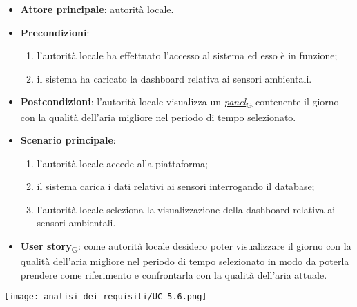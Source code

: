 \begin{itemize}
	\item \textbf{Attore principale}: autorità locale.
	\item \textbf{Precondizioni}:
	      \begin{enumerate}
		      \item l'autorità locale ha effettuato l'accesso al sistema ed esso è in funzione;
		      \item il sistema ha caricato la dashboard relativa ai sensori ambientali.
	      \end{enumerate}
	\item \textbf{Postcondizioni}: l'autorità locale visualizza un \href{https://7last.github.io/docs/rtb/documentazione-interna/glossario\#panel}{\textit{panel}\textsubscript{G}} contenente il giorno con la qualità dell'aria migliore nel periodo di tempo selezionato.
	\item \textbf{Scenario principale}:
	      \begin{enumerate}
		      \item l'autorità locale accede alla piattaforma;
		      \item il sistema carica i dati relativi ai sensori interrogando il database;
		      \item l'autorità locale seleziona la visualizzazione della dashboard relativa ai sensori ambientali.
	      \end{enumerate}
	\item \href{https://7last.github.io/docs/rtb/documentazione-interna/glossario\#user-story}{\textbf{User story}\textsubscript{G}}:
	      come autorità locale desidero poter visualizzare il giorno con la qualità dell'aria migliore nel periodo di tempo selezionato
	      in modo da poterla prendere come riferimento e confrontarla con la qualità dell'aria attuale.
\end{itemize}
\begin{center}
	\texttt{[image: analisi\_dei\_requisiti/UC-5.6.png]}
\end{center}

